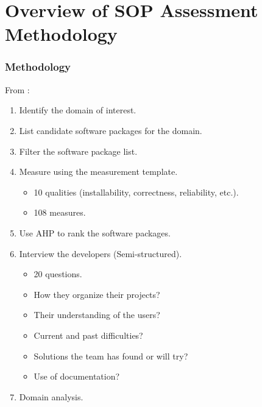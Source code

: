 \documentclass[usenames,dvipsnames]{beamer}
\begin{document}

\section[Methodology]{Overview of SOP Assessment Methodology}


\begin{frame}

  \frametitle{Methodology}
  
  From \citet{SmithEtAl2021}:

  \begin{enumerate}
    \item Identify the domain of interest.
    \item List candidate software packages for the domain.
    \item Filter the software package list.
    \item Measure using the measurement template.
    \begin{itemize}
      \item 10 qualities (installability, correctness, reliability, etc.).
      \item 108 measures.
    \end{itemize}
    \item Use AHP to rank the software packages.
    \item Interview the developers (Semi-structured).
    \begin{itemize}
      \item 20 questions.
      \item How they organize their projects?
      \item Their understanding of the users?
      \item Current and past difficulties?
      \item Solutions the team has found or will try?
      \item Use of documentation?
    \end{itemize}
    \item Domain analysis.
  \end{enumerate}
  
\end{frame}
  
\end{document}
